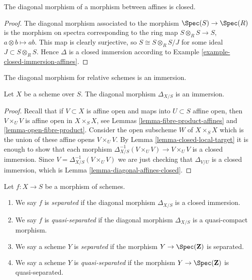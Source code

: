 \begin{lemma}
\label{lemma-diagonal-affines-closed}
The diagonal morphism of a morphism between affines is closed.
\end{lemma}

\begin{proof}
The diagonal morphism associated to the morphism
$\Spec(S) \to \Spec(R)$ is the morphism on spectra
corresponding to the ring
map $S \otimes_R S \to S$, $a \otimes b \mapsto ab$.
This map is clearly surjective, so $S \cong S \otimes_R S/J$
for some ideal $J \subset S \otimes_R S$. Hence
$\Delta$ is a closed immersion according to
Example \ref{example-closed-immersion-affines}.
\end{proof}

\begin{lemma}
\label{lemma-diagonal-immersion}
\begin{slogan}
The diagonal morphism for relative schemes is an immersion.
\end{slogan}
Let $X$ be a scheme over $S$.
The diagonal morphism $\Delta_{X/S}$ is an immersion.
\end{lemma}

\begin{proof}
Recall that if $V \subset X$ is affine open and maps into
$U \subset S$ affine open, then $V \times_U V$ is affine open
in $X \times_S X$, see Lemmas \ref{lemma-fibre-product-affines}
and \ref{lemma-open-fibre-product}.
Consider the open subscheme $W$ of $X \times_S X$ which
is the union of these affine opens $V \times_U V$.
By Lemma \ref{lemma-closed-local-target} it is enough
to show that each morphism
$\Delta_{X/S}^{-1}(V \times_U V) \to V \times_U V$ is
a closed immersion. Since $V = \Delta_{X/S}^{-1}(V \times_U V)$
we are just checking that $\Delta_{V/U}$ is a closed
immersion, which is Lemma \ref{lemma-diagonal-affines-closed}.
\end{proof}

\begin{definition}
\label{definition-separated}
\begin{reference}
\cite[Chapter II, \S 1, no. 34, axiom $(\mathrm{VA}_{II})$,
p. 227]{FAC}
\end{reference}
Let $f : X \to S$ be a morphism of schemes.
\begin{enumerate}
\item We say $f$ is {\it separated} if the diagonal morphism $\Delta_{X/S}$
is a closed immersion.
\item We say $f$ is {\it quasi-separated} if the diagonal morphism
$\Delta_{X/S}$ is a quasi-compact morphism.
\item We say a scheme $Y$ is {\it separated} if the morphism
$Y \to \Spec(\mathbf{Z})$ is separated.
\item We say a scheme $Y$ is {\it quasi-separated} if the morphism
$Y \to \Spec(\mathbf{Z})$ is quasi-separated.
\end{enumerate}
\end{definition}

